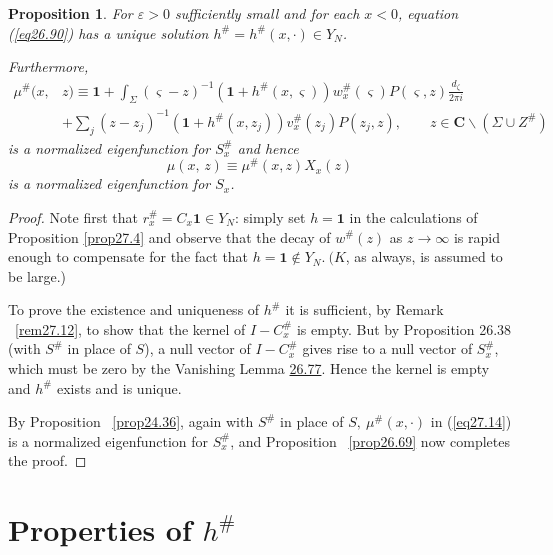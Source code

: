 \documentclass{surv-l}
\theoremstyle{plain}
\newtheorem{prop}[theorem]{Proposition}
\theoremstyle{definition}
\numberwithin{equation}{chapter}
\begin{document}
\begin{prop}\label{pro27.13}
For $\varepsilon >0$ sufficiently small and for each $x<0$, equation
\emph{(\ref{eq26.90})} has a unique solution $h^{\#} =h^{\#}(x, \cdot)\in Y_{N}$.

Furthermore,
\setcounter{equation}{13}
\begin{align}\label{eq27.14}
\mu^{\#}(x, &z)\equiv \mathbf{1} + \int_{\Sigma}(\varsigma-z)^{-1}(\mathbf{1} +h^{\#}(x,\varsigma))w_{x}^{\#} (\varsigma)P(\varsigma, z)\frac{d_{\zeta}}{2\pi i}\\
&+\sum_{j}(z-z_{j})^{-1}(\mathbf{1}+h^{\#} (x, z_{j}))v_{x}^{\#}(z_{j})P(z_{j},z),\qquad z\in \mathbf{C}\backslash (\Sigma\cup Z^{\#})\nonumber
\end{align}
is a normalized eigenfunction for $S_{x}^{\#}$ and hence
\begin{equation}\label{eq27.15}
\mu(x,\, z)\equiv\mu^{\#}(x,z)X_{x}(z)
\end{equation}
is a normalized eigenfunction for $S_{x}$.
\end{prop}

\begin{proof} Note first that $r_{x}^{\#}=C_{x}\mathbf{1} \in Y_{N}$: simply set $h=\mathbf{1}$ in the calculations of Proposition \ref{prop27.4} and observe that the decay of $w^{\#}(z)$ as $ z\rightarrow\infty$ is rapid enough to compensate for the fact that $h=\mathbf{1}\not\in Y_{N}.\ (K$, as always, is assumed to be large.)

To prove the existence and uniqueness of $h^{\#}$ it is sufficient, by Remark ~\ref{rem27.12}, to show that the kernel of $I-C_{x}^{\#}$ is empty. But by Proposition 26.38 (with $ S^{\#}$ in place of $S$), a null vector of $ I-C_{x}^{\#}$ gives rise to a null vector of $S_{x}^{\#}$, which must be zero by the Vanishing Lemma \hyperref[vlem26.77]{26.77}. Hence the kernel is empty and $h^{\#}$ exists and is unique.

By Proposition ~\ref{prop24.36}, again with $S^{\#}$ in place of $S,\ \mu^{\#}(x, \cdot)$ in (\ref{eq27.14}) is a normalized eigenfunction for $S_{x}^{\#}$, and Proposition ~\ref{prop26.69} now completes the proof.
\end{proof}

\section{Properties of $h^{\#}$}\label{sec28}
\renewcommand\theequation{\arabic{section}.\arabic{equation}}
\end{document}
